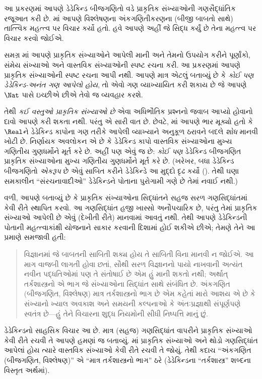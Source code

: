 \documentclass[../../../include/open-logic-section]{subfiles}
\begin{document}


આ પ્રકરણમાં આપણે ડેડેકિન્ડ બીજગણિતો વડે પ્રાકૃતિક સંખ્યાઓની
ગણસૈદ્ધાંતિક રજૂઆત કરી છે. માં આપણે
વિશ્લેષણના અંકગણિતીકરણના (બીજી બાબતો સાથે) તાત્ત્વિક મહત્ત્વ પર
વિચાર કર્યો હતો. હવે આપણે અહીં જે સિદ્ધ કર્યું છે તેના મહત્ત્વ પર
વિચાર કરવો જોઈએ.

સમગ્ર માં આપણે પ્રાકૃતિક સંખ્યાઓને આપેલી
માની અને તેમનો ઉપયોગ કરીને પૂર્ણાંકો, સંમેય સંખ્યાઓ અને વાસ્તવિક
સંખ્યાઓની સ્પષ્ટ રચના કરી. આ પ્રકરણમાં આપણે પ્રાકૃતિક સંખ્યાઓની સ્પષ્ટ
રચના આપી નથી. આપણે માત્ર એટલું બતાવ્યું છે કે \emph{કોઈ પણ
ડેડેકિન્ડ-અનંત ગણ આપેલો હોય}, તો એવો ગણ વ્યાખ્યાયિત કરી શકાય છે જે
આપણે~$\Nat$ પાસે ઇચ્છીએ છીએ તેવો જ વ્યવહાર કરશે.

તેથી \emph{કઈ વસ્તુઓ પ્રાકૃતિક સંખ્યાઓ છે} એવા અધિભૌતિક પ્રશ્નનો
જવાબ આપ્યો હોવાનો દાવો આપણે કરી શકતા નથી. પરંતુ એ સારી વાત છે. છેવટે,
માં આપણે ભાર મૂક્યો હતો કે
$\Real$ને ડેડેકિન્ડ કાપોના ગણ તરીકે આપેલી વ્યાખ્યાને અનુકૂળ ઠરાવને
બદલે \emph{શોધ} માનવી ખોટી છે. નિર્ણાયક અવલોકન એ છે કે ડેડેકિન્ડ
કાપો વાસ્તવિક સંખ્યાઓના મુખ્ય ગણિતીય ગુણધર્મોને મૂર્ત કરે છે. અહીં
પણ એવું જ છે: \emph{કોઈ પણ} ડેડેકિન્ડ બીજગણિત પ્રાકૃતિક સંખ્યાઓના
મુખ્ય ગણિતીય ગુણધર્મોને મૂર્ત કરે છે. (ખરેખર, બધા ડેડેકિન્ડ બીજગણિતો
\emph{એકરૂપ} છે એવું સાબિત કરીને ડેડેકિન્ડે આ મુદ્દો દૃઢ કર્યો
(\citeyear[Theorems
132--3]{Dedekind1888}). તેથી ઘણા સમકાલીન
``સંરચનાવાદીઓ'' ડેડેકિન્ડને પોતાના પુરોગામી ગણે છે તેમાં નવાઈ નથી.)

 વળી, આપણે બતાવ્યું છે કે પ્રાકૃતિક સંખ્યાઓના સિદ્ધાંતને સહજ સરળ
 ગણસિદ્ધાંતમાં કેવી રીતે સ્થાપિત કરવો. આ ગણસિદ્ધાંત હજી ખાસ્સો
 અનૌપચારિક છે, પરંતુ તેમાં પ્રાકૃતિક સંખ્યાઓ આપેલી છે એવું (દેખીતી
 રીતે) માનવામાં આવતું નથી. તેથી આપણે ડેડેકિન્ડની પોતાની મહત્ત્વાકાંક્ષી
 યોજનાને સાકાર કરવાની દિશામાં હોઈ શકીએ છીએ; તેમણે તેને આ પ્રમાણે
 સમજાવી હતી:
\begin{quote}
	વિજ્ઞાનમાં જે બાબતની સાબિતી શક્ય હોય તે સાબિતી વિના માનવી ન જોઈએ.
	આ માગ વાજબી લાગતી હોવા છતાં, સૌથી સરળ વિજ્ઞાનનો પાયો નાખવાની
	અત્યંત નવીન પદ્ધતિઓમાં પણ તે સંતોષાઈ છે એમ હું માની શકતો નથી;
	અર્થાત્ તર્કશાસ્ત્રનો એ ભાગ જે સંખ્યાઓના સિદ્ધાંત સાથે સંબંધિત છે.
	અંકગણિત (બીજગણિત, વિશ્લેષણ) માત્ર તર્કશાસ્ત્રનો ભાગ છે એમ કહેતાં
	મારો આશય એ છે કે સંખ્યાનો ખ્યાલ અવકાશ અને સમયની કલ્પનાઓ કે
	અંતઃપ્રજ્ઞાથી સંપૂર્ણપણે સ્વતંત્ર છે---હું તેને વિચારના શુદ્ધ
	નિયમોની સીધી નિષ્પત્તિ માનું છું.
	\citep[preface]{Dedekind1888}
\end{quote}
ડેડેકિન્ડનો સાહસિક વિચાર આ છે. માત્ર (સહજ) ગણસિદ્ધાંત વાપરીને
પ્રાકૃતિક સંખ્યાઓ કેવી રીતે રચવી તે આપણે હમણાં જ બતાવ્યું.
માં પ્રાકૃતિક સંખ્યાઓ અને થોડો ગણસિદ્ધાંત
આપેલાં હોય ત્યારે વાસ્તવિક સંખ્યાઓ કેવી રીતે રચવી તે જોયું. તેથી કદાચ
``અંકગણિત (બીજગણિત, વિશ્લેષણ)'' એ ``માત્ર તર્કશાસ્ત્રનો ભાગ'' ઠરે
(ડેડેકિન્ડના ``તર્કશાસ્ત્ર'' શબ્દના વિસ્તૃત અર્થમાં).
\end{document}
